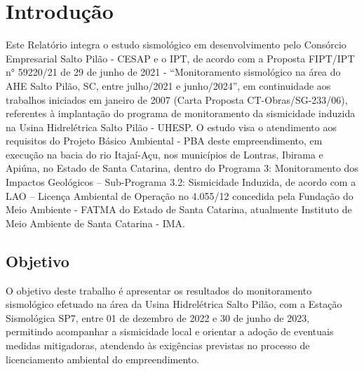 \section{Introdução}
\par{Este Relatório integra o estudo sismológico em desenvolvimento pelo Consórcio Empresarial Salto Pilão - CESAP e o IPT, de acordo com a Proposta FIPT/IPT n° 59220/21 de 29 de junho de 2021 - “Monitoramento sismológico na área do AHE Salto Pilão, SC, entre julho/2021 e junho/2024”, em continuidade aos trabalhos iniciados em janeiro de 2007 (Carta Proposta CT-Obras/SG-233/06), referentes à implantação do programa de monitoramento da sismicidade induzida na Usina Hidrelétrica Salto Pilão - UHESP. O estudo visa o atendimento aos requisitos do Projeto Básico Ambiental - PBA deste empreendimento, em execução na bacia do rio Itajaí-Açu, nos municípios de Lontras, Ibirama e Apiúna, no Estado de Santa Catarina, dentro do Programa 3: Monitoramento dos Impactos Geológicos – Sub-Programa 3.2: Sismicidade Induzida, de acordo com a LAO – Licença Ambiental de Operação no 4.055/12 concedida pela Fundação do Meio Ambiente - FATMA do Estado de Santa Catarina, atualmente Instituto de Meio Ambiente de Santa Catarina - IMA.}

\subsection{Objetivo}
\par{O objetivo deste trabalho é apresentar os resultados do monitoramento sismológico efetuado na área da Usina Hidrelétrica Salto Pilão, com a Estação Sismológica SP7, entre 01 de dezembro de 2022 e 30 de junho de 2023, permitindo acompanhar a sismicidade local e orientar a adoção de eventuais medidas mitigadoras, atendendo às exigências previstas no processo de licenciamento ambiental do empreendimento.}
